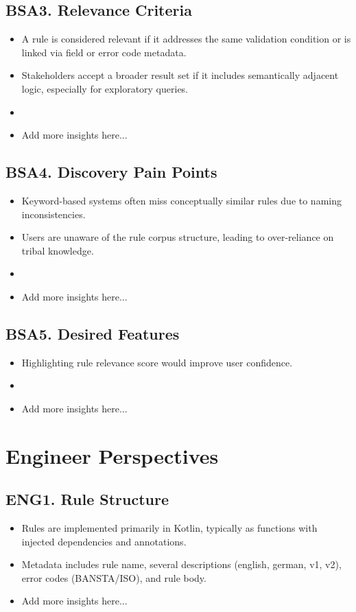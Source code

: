 \subsection*{BSA3. Relevance Criteria}
\begin{itemize}
  \item A rule is considered relevant if it addresses the same validation condition or is linked via field or error code metadata.
  \item Stakeholders accept a broader result set if it includes semantically adjacent logic, especially for exploratory queries.
  \item \item Add more insights here...
\end{itemize}

\subsection*{BSA4. Discovery Pain Points}
\begin{itemize}
  \item Keyword-based systems often miss conceptually similar rules due to naming inconsistencies.
  \item Users are unaware of the rule corpus structure, leading to over-reliance on tribal knowledge.
  \item \item Add more insights here...
\end{itemize}

\subsection*{BSA5. Desired Features}
\begin{itemize}
  \item Highlighting rule relevance score would improve user confidence.
  \item \item Add more insights here...
\end{itemize}

\section{Engineer Perspectives}

\subsection*{ENG1. Rule Structure}
\begin{itemize}
  \item Rules are implemented primarily in Kotlin, typically as functions with injected dependencies and annotations.
  \item Metadata includes rule name, several descriptions (english, german, v1, v2), error codes (BANSTA/ISO), and rule body.
  \item Add more insights here...
\end{itemize}

